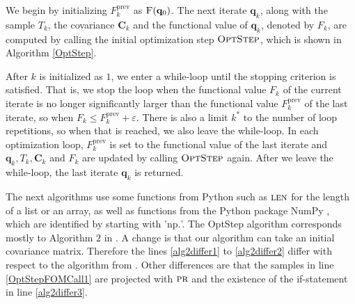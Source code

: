 We begin by initializing $F^\mathrm{prev}_{k}$ as $\Call{F}{\mathbf{q}_0}$. The next iterate $\mathbf{q}_k$, along with the sample $T_k$, the covariance $\mathbf{C}_k$ and the functional value of $\mathbf{q}_k$, denoted by $F_k$, are computed by calling the initial optimization step $\textproc{OptStep}$, which is shown in Algorithm \ref{OptStep}.

After $k$ is initialized as $1$, we enter a while-loop until the stopping criterion is satisfied. That is, we stop the loop when the functional value $F_k$ of the current iterate is no longer significantly larger than the functional value $F^\mathrm{prev}_k$ of the last iterate, so when $F_k\leq F^\mathrm{prev}_k+\varepsilon$. There is also a limit $k^*$ to the number of loop repetitions, so when that is reached, we also leave the while-loop. In each optimization loop, $F^\mathrm{prev}_{k}$ is set to the functional value of the last iterate and $\mathbf{q}_k,T_k,\mathbf{C}_k$ and $F_k$ are updated by calling $\textproc{OptStep}$ again. After we leave the while-loop, the last iterate $\mathbf{q}_k$ is returned.

The next algorithms use some functions from Python such as $\textproc{len}$ for the length of a list or an array, as well as functions from the Python package NumPy \cite{harris2020array}, which are identified by starting with '$\mathrm{np.}$'. The OptStep algorithm corresponds mostly to Algorithm $2$ in \cite{Keil2022-dj}. A change is that our algorithm can take an initial covariance matrix. Therefore the lines \ref{alg2differ1} to \ref{alg2differ2} differ with respect to the algorithm from \cite{Keil2022-dj}. Other differences are that the samples in line \ref{OptStepFOMCall1} are projected with $\textproc{pr}$ and the existence of the if-statement in line \ref{alg2differ3}.

